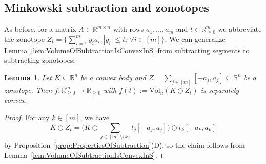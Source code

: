 \documentclass[12pt,english]{article}
\theoremstyle{theorem}
\newtheorem{lemma}[theorem]{Lemma}
\theoremstyle{remark}
\providecommand{\setR}{\mathbb{R}}
\newcommand{\Vol}{\mathrm{Vol}}
\begin{document}
\subsection{Minkowski subtraction and zonotopes}


As before, for a matrix $A \in \setR^{m \times n}$ with rows $a_1, \dots, a_m$
and $t \in \setR_{\geq 0}^m$ we abbreviate the zonotope $Z_t = \{ \sum_{i=1}^m y_ia_i : |y_i| \leq t_i \; \forall i \in [m]\}$.
We can generalize Lemma~\ref{lem:VolumeOfSubtractionIsConvexInS} from subtracting segments to subtracting zonotopes:
\begin{lemma} \label{lem:VolOfMinkSubtractionIsSepConvex}
  Let $K \subseteq \setR^n$ be a convex body and $Z = \sum_{j \in [m]} [-a_j, a_j]\subseteq \setR^n$ be a zonotope.
  Then $f : \setR_{\ge 0}^m \to \setR_{\geq 0}$ with $f(t) := \Vol_n(K \ominus Z_t)$ is separately convex.
\end{lemma}
\begin{proof}
  For any $k \in [m]$, we have
  \[
    K \ominus Z_t = \Big(K \ominus \sum_{j \in [m]\setminus \{k\}} t_j [-a_j, a_j]\Big) \ominus t_k [-a_k,a_k]
  \]
  by Proposition~\ref{prop:PropertiesOfSubtraction}(D), so the claim follows from Lemma~\ref{lem:VolumeOfSubtractionIsConvexInS}.
\end{proof}
\end{document}

